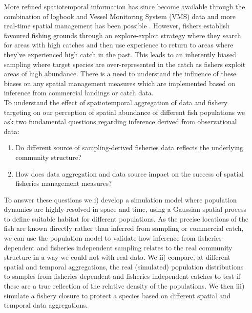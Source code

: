 \documentclass[review]{elsarticle}
\begin{document}
More refined spatiotemporal information has since become available through the
combination of logbook and Vessel Monitoring System (VMS) data \citep{Lee2010,
	Bastardie2010, Gerritsen2012, Mateo2016} and more real-time spatial
management has been possible \citep[e.g.][]{Holmes2011}.  However, fishers
establish favoured fishing grounds through an explore-exploit strategy
\citep{Rijnsdorp2011, Bailey2018} where they search for areas with high catches
and then use experience to return to areas where they've experienced high catch
in the past.  This leads to an inherently biased sampling where target species
are over-represented in the catch as fishers exploit areas of high abundance.
There is a need to understand the influence of these biases on any spatial
management measures which are implemented based on inference from commercial
landings or catch data. \\ 

To understand the effect of spatiotemporal aggregation of data and fishery
targeting on our perception of spatial abundance of different fish populations
we ask two fundamental questions regarding inference derived from observational
data:

\begin{enumerate}
	\item Do different source of sampling-derived fisheries data
		reflects the underlying community structure? 	
	\item How does data aggregation and data source impact on the success
		of spatial fisheries management measures?
\end{enumerate}
	
To answer these questions we i) develop a simulation model where population
dynamics are highly-resolved in space and time, using a Gaussian spatial
process to define suitable habitat for different populations. As the precise
locations of the fish are known directly rather than inferred from sampling
or commercial catch, we can use the population model to validate how inference
from fisheries-dependent and fisheries independent sampling relates to the real
community structure in a way we could not with real data. We ii) compare, at
different spatial and temporal aggregations, the real (simulated) population
distributions to samples from fisheries-dependent and fisheries independent
catches to test if these are a true reflection of the relative density of the
populations. We then iii) simulate a fishery closure to protect a species based
on different spatial and temporal data aggregations. \\
\end{document}
